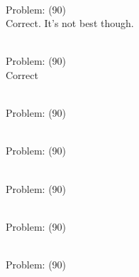 \documentclass[11pt]{article}
\begin{document}
\begin{minipage}[t]{0.5\textwidth}
  {\centering
  
\\
Problem: (90)\\
Correct. It's not best though.\\
  }
\end{minipage}
\begin{minipage}[t]{0.5\textwidth}
  {\centering
  
\\
Problem: (90)\\
Correct\\
  }
\end{minipage}
\begin{minipage}[t]{0.5\textwidth}
  {\centering
  
\\
Problem: (90)\\
  }
\end{minipage}
\begin{minipage}[t]{0.5\textwidth}
  {\centering
  
\\
Problem: (90)\\
  }
\end{minipage}
\begin{minipage}[t]{0.5\textwidth}
  {\centering
  
\\
Problem: (90)\\
  }
\end{minipage}
\begin{minipage}[t]{0.5\textwidth}
  {\centering
  
\\
Problem: (90)\\
  }
\end{minipage}
\begin{minipage}[t]{0.5\textwidth}
  {\centering
  
\\
Problem: (90)\\
  }
\end{minipage}
\end{document}
